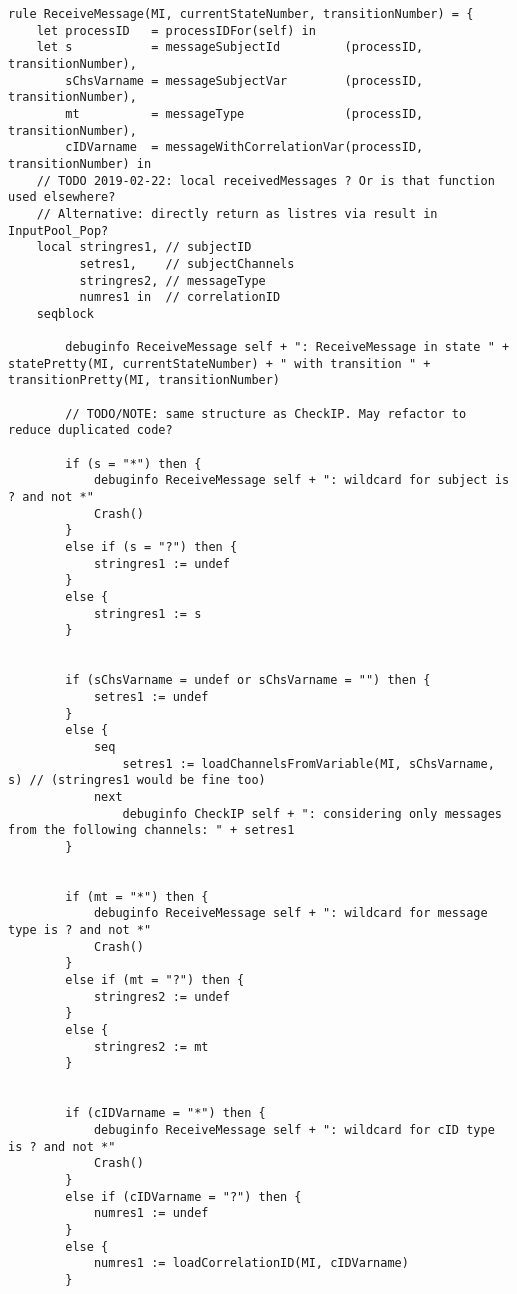 \begin{listing}[H]
\begin{verbatim}
rule ReceiveMessage(MI, currentStateNumber, transitionNumber) = {
    let processID   = processIDFor(self) in
    let s           = messageSubjectId         (processID, transitionNumber),
        sChsVarname = messageSubjectVar        (processID, transitionNumber),
        mt          = messageType              (processID, transitionNumber),
        cIDVarname  = messageWithCorrelationVar(processID, transitionNumber) in
    // TODO 2019-02-22: local receivedMessages ? Or is that function used elsewhere?
    // Alternative: directly return as listres via result in InputPool_Pop?
    local stringres1, // subjectID
          setres1,    // subjectChannels
          stringres2, // messageType
          numres1 in  // correlationID
    seqblock

        debuginfo ReceiveMessage self + ": ReceiveMessage in state " + statePretty(MI, currentStateNumber) + " with transition " + transitionPretty(MI, transitionNumber)

        // TODO/NOTE: same structure as CheckIP. May refactor to reduce duplicated code?

        if (s = "*") then {
            debuginfo ReceiveMessage self + ": wildcard for subject is ? and not *"
            Crash()
        }
        else if (s = "?") then {
            stringres1 := undef
        }
        else {
            stringres1 := s
        }


        if (sChsVarname = undef or sChsVarname = "") then {
            setres1 := undef
        }
        else {
            seq
                setres1 := loadChannelsFromVariable(MI, sChsVarname, s) // (stringres1 would be fine too)
            next
                debuginfo CheckIP self + ": considering only messages from the following channels: " + setres1
        }


        if (mt = "*") then {
            debuginfo ReceiveMessage self + ": wildcard for message type is ? and not *"
            Crash()
        }
        else if (mt = "?") then {
            stringres2 := undef
        }
        else {
            stringres2 := mt
        }


        if (cIDVarname = "*") then {
            debuginfo ReceiveMessage self + ": wildcard for cID type is ? and not *"
            Crash()
        }
        else if (cIDVarname = "?") then {
            numres1 := undef
        }
        else {
            numres1 := loadCorrelationID(MI, cIDVarname)
        }




\end{verbatim}
\end{listing}
